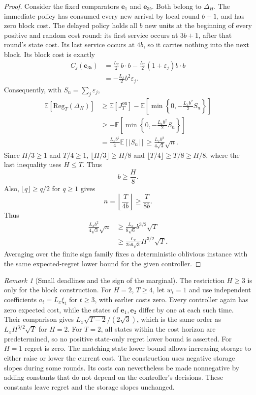 \documentclass[11pt]{article}
\newcommand{\E}{\mathbb{E}}
\newcommand{\Reg}{\mathrm{Reg}}
\theoremstyle{plain}
\theoremstyle{remark}
\newtheorem{Thm:Remark}[Thm:Theorem]{Remark}
\numberwithin{equation}{section}
\begin{document}
\begin{proof}
Consider the fixed comparators $\mathbf e_1$ and $\mathbf e_{3b}$. Both belong to $\Delta_H$.
The immediate policy has consumed every new arrival by local round $b+1$,
and has zero block cost. The delayed policy holds all $b$ new units at the
beginning of every positive and random cost round: its first service occurs
at $3b+1$, after that round's state cost. Its last service occurs at $4b$,
so it carries nothing into the next block. Its block cost is exactly
\begin{align}
C_j(\mathbf e_{3b})
&=\frac{L_x}{2}\,b\cdot b
-\frac{L_x}{2}(1+\varepsilon_j)b\cdot b\nonumber\\
&=-\frac{L_x}{2}b^2\varepsilon_j.
\label{ch6:eq:block-comparator}
\end{align}
Consequently, with $S_n=\sum_j\varepsilon_j$,
\begin{align}
 \E[\Reg_T(\Delta_H)]
 &\ge \E[J_T^{\mathrm{on}}]
 -\E\left[\min\!\left\{0,-\frac{L_xb^2}{2}S_n\right\}\right]\nonumber\\
 &\ge-\E\left[\min\!\left\{0,-\frac{L_xb^2}{2}S_n\right\}\right]\nonumber\\
 &=\frac{L_xb^2}{4}\E[|S_n|]
 \ge\frac{L_xb^2}{4\sqrt3}\sqrt n.
 \label{ch6:eq:block-lower}
\end{align}
Since $H/3\ge1$ and $T/4\ge1$,
$\lfloor H/3\rfloor\ge H/8$ and
$\lfloor T/4\rfloor\ge T/8\ge H/8$, where the last inequality uses $H\le T$. Thus
\[
b\ge\frac{H}{8}.
\]
Also, $\lfloor q\rfloor\ge q/2$ for $q\ge1$ gives
\[
n=\left\lfloor\frac{T}{4b}\right\rfloor
\ge\frac{T}{8b}.
\]
Thus
\begin{align*}
\frac{L_xb^2}{4\sqrt3}\sqrt n
&\ge\frac{L_x}{8\sqrt6}b^{3/2}\sqrt T\\
&\ge\frac{L_x}{256\sqrt3}H^{3/2}\sqrt T.
\end{align*}
Averaging over the finite sign family fixes a deterministic oblivious
instance with the same expected-regret lower bound for the given controller.
\end{proof}

\begin{Thm:Remark}[Small deadlines and the sign of the marginal]
The restriction $H\ge3$ is only for the block construction.
For $H=2$, $T\ge4$, let $w_t=1$ and use independent coefficients
$a_t=L_x\xi_t$ for $t\ge3$, with earlier costs zero.
Every controller again has zero expected cost, while the states of
$\mathbf e_1,\mathbf e_2$ differ by one at each such time. Their comparison gives
$L_x\sqrt{T-2}/(2\sqrt3)$, which is the same order as
$L_xH^{3/2}\sqrt T$ for $H=2$.
For $T=2$, all states within the cost horizon are predetermined, so no positive
state-only regret lower bound is asserted. For $H=1$ regret is zero.
The matching state lower bound allows increasing storage to either raise
or lower the current cost. The construction uses negative storage slopes
during some rounds. Its costs can nevertheless be made nonnegative by
adding constants that do not depend on the controller's decisions.
These constants leave regret and the storage slopes unchanged.
\end{Thm:Remark}
\end{document}
